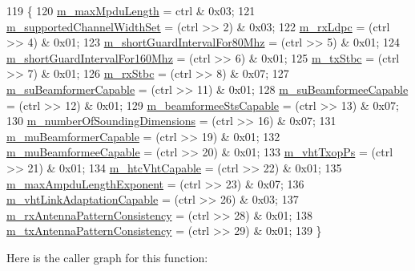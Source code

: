 \begin{DoxyCode}
119 \{
120   \hyperlink{classns3_1_1VhtCapabilities_a50f9372914daf48375359a4159cd3ad0}{m\_maxMpduLength} = ctrl & 0x03;
121   \hyperlink{classns3_1_1VhtCapabilities_a5beb0948abe32fd1b77317b6057d1639}{m\_supportedChannelWidthSet} = (ctrl >> 2) & 0x03;
122   \hyperlink{classns3_1_1VhtCapabilities_ac7538c76efb246f9c076a69d605c8d65}{m\_rxLdpc} = (ctrl >> 4) & 0x01;
123   \hyperlink{classns3_1_1VhtCapabilities_a17def5a3281c3fbecb315a9f0ccc2d8d}{m\_shortGuardIntervalFor80Mhz} = (ctrl >> 5) & 0x01;
124   \hyperlink{classns3_1_1VhtCapabilities_aaaba1407325ab2e1eb5d0a063058e6e4}{m\_shortGuardIntervalFor160Mhz} = (ctrl >> 6) & 0x01;
125   \hyperlink{classns3_1_1VhtCapabilities_a67911a0a1dbc994b8b9c79567cc1059b}{m\_txStbc} = (ctrl >> 7) & 0x01;
126   \hyperlink{classns3_1_1VhtCapabilities_a6dccb436c32dda6ccbdbaf67928cdece}{m\_rxStbc} = (ctrl >> 8) & 0x07;
127   \hyperlink{classns3_1_1VhtCapabilities_a6c6a15832cd47a4c9e48f93edad69b27}{m\_suBeamformerCapable} = (ctrl >> 11) & 0x01;
128   \hyperlink{classns3_1_1VhtCapabilities_aabc73c23623e50a9dba2dfaadf31befa}{m\_suBeamformeeCapable} = (ctrl >> 12) & 0x01;
129   \hyperlink{classns3_1_1VhtCapabilities_aaecf70161e31da3bd6bda12f92bf3ac9}{m\_beamformeeStsCapable} = (ctrl >> 13) & 0x07;
130   \hyperlink{classns3_1_1VhtCapabilities_adc25185f388e5c4ee9ea95e226d2d19d}{m\_numberOfSoundingDimensions} = (ctrl >> 16) & 0x07;
131   \hyperlink{classns3_1_1VhtCapabilities_a436c61de355e9140334b068c001cabde}{m\_muBeamformerCapable} = (ctrl >> 19) & 0x01;
132   \hyperlink{classns3_1_1VhtCapabilities_a4ad315b53baa57cf62dccd0505107f36}{m\_muBeamformeeCapable} = (ctrl >> 20) & 0x01;
133   \hyperlink{classns3_1_1VhtCapabilities_a65e925626af356b9b272e673921ca919}{m\_vhtTxopPs} = (ctrl >> 21) & 0x01;
134   \hyperlink{classns3_1_1VhtCapabilities_a026afef6660a4220b432ec4f1cefcd58}{m\_htcVhtCapable} = (ctrl >> 22) & 0x01;
135   \hyperlink{classns3_1_1VhtCapabilities_aef0f011be7c0aa3224d22a93dfc5cc22}{m\_maxAmpduLengthExponent} = (ctrl >> 23) & 0x07;
136   \hyperlink{classns3_1_1VhtCapabilities_a271c69d342916c0dbd34e4847a7373a2}{m\_vhtLinkAdaptationCapable} = (ctrl >> 26) & 0x03;
137   \hyperlink{classns3_1_1VhtCapabilities_abfe153a6daae103951c55c3f33d34886}{m\_rxAntennaPatternConsistency} = (ctrl >> 28) & 0x01;
138   \hyperlink{classns3_1_1VhtCapabilities_ad4e0ac2f77ac2c5d8e9e344d36492110}{m\_txAntennaPatternConsistency} = (ctrl >> 29) & 0x01;
139 \}
\end{DoxyCode}


Here is the caller graph for this function\+:


